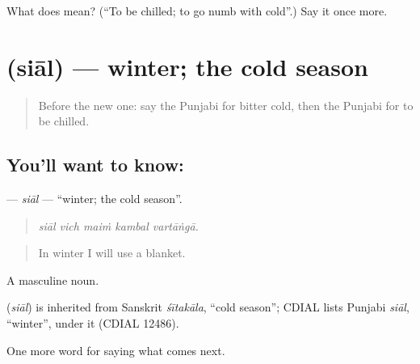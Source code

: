 \begin{tcolorbox}[breakable,colback=teal!4,colframe=teal!35!black,title={Before you move on}]
What does  mean? (\textquotedblleft{}To be chilled; to go numb with cold\textquotedblright{}.) Say it once more.
\end{tcolorbox}
\section[\texorpdfstring{\pa{ਸਿਆਲ} (siāl)}{ਸਿਆਲ (siāl)}]{ (siāl) — winter; the cold season}

\label{lesson:PA-C289-sial}



\begin{quote}
Before the new one: say the Punjabi for bitter cold, then the Punjabi for to be chilled.
\end{quote}

\subsection*{You'll want to know: }
\textbf{} — \emph{siāl} — \textquotedblleft{}winter; the cold season\textquotedblright{}.

\begin{quote}
    
\end{quote}

\begin{quote}
\emph{siāl vich maiṁ kambal vartāṅgā.}
\end{quote}

\begin{quote}
In winter I will use a blanket.
\end{quote}

A masculine noun.

\begin{cousinweb}
\textbf{} (\emph{siāl}) is inherited from Sanskrit \emph{śītakāla}, \textquotedblleft{}cold season\textquotedblright{}; CDIAL lists Punjabi \emph{siāl}, \textquotedblleft{}winter\textquotedblright{}, under it (CDIAL 12486).
\end{cousinweb}

\begin{grammarlens}[title={What you've built}]
One more word for saying what comes next.
\end{grammarlens}

